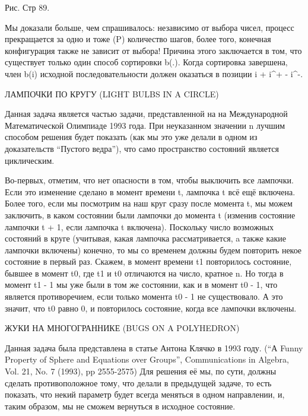                                   Рис. Стр 89.


  Мы доказали больше, чем спрашивалось: независимо от выбора чисел, процесс прекращается за одно и тоже (P)  количество  шагов, более того, конечная конфигурация также не зависит от выбора! Причина этого заключается в том, что существует только один способ сортировки b(.). Когда сортировка завершена, член b(i) исходной последовательности должен оказаться в позиции i + i^+ - i^-.




ЛАМПОЧКИ ПО КРУГУ (LIGHT BULBS IN A CIRCLE)


  Данная задача является частью задачи, представленной на на Международной Математической Олимпиаде 1993 года. При неуказанном значении n лучшим способом решения будет показать (как мы это уже делали в одном из доказательств “Пустого ведра”), что само пространство состояний является циклическим.


  Во-первых, отметим, что нет опасности в том, чтобы выключить все лампочки. Если это изменение сделано в момент времени t, лампочка t всё ещё включена. Более того, если мы посмотрим на наш круг сразу после момента t, мы можем заключить, в каком состоянии были лампочки до  момента t (изменив состояние лампочки t + 1, если лампочка t включена). Поскольку число возможных состояний в круге (учитывая, какая лампочка рассматривается, a также  какие лампочки включены) конечно, то мы со временем должны будем повторить некое состояние в первый раз. Скажем, в момент времени t1 повторилось состояние, бывшее в момент t0, где t1 и t0 отличаются на число, кратное n. Но тогда в момент t1 - 1 мы уже были в том же состоянии, как и в момент t0 - 1, что является противоречием, если только момента t0 - 1 не существовало. А это значит, что t0 равно 0, и повторилось состояние, когда все лампочки включены.


ЖУКИ НА МНОГОГРАННИКЕ (BUGS ON A POLYHEDRON)


   Данная задача была представлена в статье  Антона Клячко в 1993 году.
 (“А Funny Property of Sphere and Equations over Groups”, Communications in Algebra, Vol. 21, No. 7 (1993), pp 2555-2575) 
Для решения её мы, по сути, должны сделать противоположное тому, что делали в предыдущей задаче, то есть показать, что некий параметр будет всегда меняться в одном направлении, и, таким образом, мы не сможем вернуться в исходное состояние.
  
